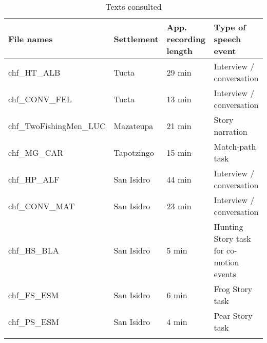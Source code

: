 \documentclass[output=paper
,modfonts
,nonflat]{langsci/langscibook}
\begin{document}
\begin{table}[H]
	\caption{Texts consulted}
	\label{tab:pico:7}
	\small
	\begin{tabularx}{\textwidth}{lXXX}
	\lsptoprule
	File names                                                                             & Settlement & App. recording length & Type of speech event                    \\ 
	\midrule
	chf\_HT\_ALB                      & Tucta      & 29 min                                                                 & Interview / conversation             \\ 
	chf\_CONV\_FEL                          & Tucta      & 13 min                                                                 & Interview / conversation                \\ 
	chf\_TwoFishingMen\_LUC                                                                    & Mazateupa  & 21 min                                                                 & Story narration                                                                   \\ 
	chf\_MG\_CAR                                 & Tapotzingo & 15 min                                                                 & Match-path task                                                                   \\ 
	chf\_HP\_ALF                         & San Isidro & 44 min                                                                 & Interview / conversation                \\ 
	chf\_CONV\_MAT                      & San Isidro & 23 min                                                                 & Interview / conversation                \\ 
	chf\_HS\_BLA                                                                               & San Isidro & 5 min                                                                  & Hunting Story task for co-motion events \\ 
	chf\_FS\_ESM                  & San Isidro & 6 min                                                                  & Frog Story task                                                                   \\ 
	chf\_PS\_ESM             & San Isidro & 4 min                                                                  & Pear Story task        \\                                                            
	\lspbottomrule
	\end{tabularx}%
\end{table}
\end{document}
